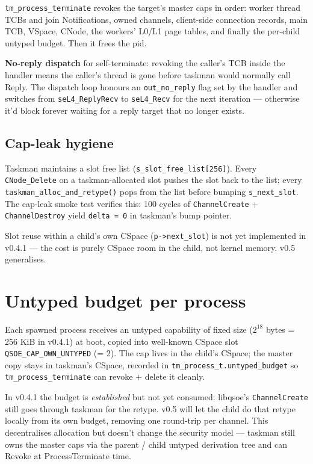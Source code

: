 \texttt{tm\_process\_terminate} revokes the target's master caps in
order: worker thread TCBs and join Notifications, owned channels,
client-side connection records, main TCB, VSpace, CNode, the
workers' L0/L1 page tables, and finally the per-child untyped
budget.  Then it frees the pid.

\textbf{No-reply dispatch} for self-terminate: revoking the caller's
TCB inside the handler means the caller's thread is gone before
taskman would normally call Reply.  The dispatch loop honours an
\texttt{out\_no\_reply} flag set by the handler and switches from
\texttt{seL4\_ReplyRecv} to \texttt{seL4\_Recv} for the next
iteration --- otherwise it'd block forever waiting for a reply target
that no longer exists.

\subsection{Cap-leak hygiene}

Taskman maintains a slot free list
(\texttt{s\_slot\_free\_list[256]}).  Every \texttt{CNode\_Delete} on
a taskman-allocated slot pushes the slot back to the list; every
\texttt{taskman\_alloc\_and\_retype()} pops from the list before
bumping \texttt{s\_next\_slot}.  The cap-leak smoke test verifies
this: 100 cycles of \texttt{ChannelCreate} + \texttt{ChannelDestroy}
yield \texttt{delta = 0} in taskman's bump pointer.

Slot reuse within a child's own CSpace (\texttt{p->next\_slot}) is
not yet implemented in v0.4.1 --- the cost is purely CSpace room in
the child, not kernel memory.  v0.5 generalises.

\section{Untyped budget per process}
\label{sec:untyped-budget}

Each spawned process receives an untyped capability of fixed size
($2^{18}$ bytes = 256 KiB in v0.4.1) at boot, copied into well-known
CSpace slot \texttt{QSOE\_CAP\_OWN\_UNTYPED} (= 2).  The cap lives in
the child's CSpace; the master copy stays in taskman's CSpace,
recorded in \texttt{tm\_process\_t.untyped\_budget} so
\texttt{tm\_process\_terminate} can revoke + delete it cleanly.

In v0.4.1 the budget is \emph{established} but not yet consumed:
libqsoe's \texttt{ChannelCreate} still goes through taskman for the
retype.  v0.5 will let the child do that retype locally from its own
budget, removing one round-trip per channel.  This decentralises
allocation but doesn't change the security model --- taskman still
owns the master caps via the parent / child untyped derivation tree
and can Revoke at ProcessTerminate time.

